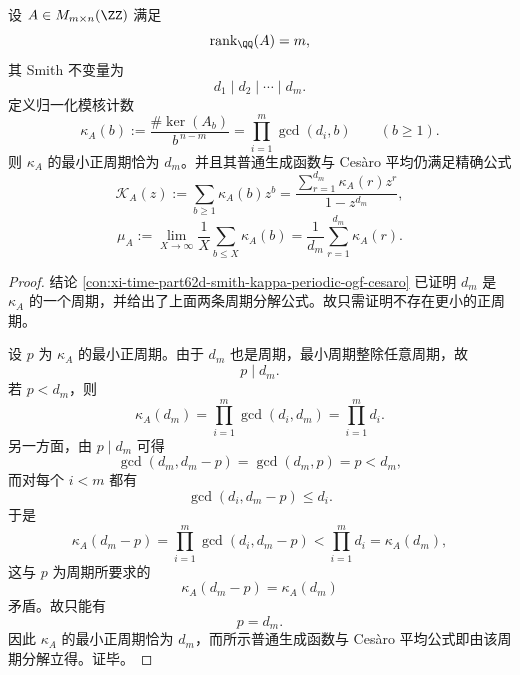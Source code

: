 \begin{conclusion}\label{con:xi-time-part62da-smith-kappa-minimal-period}
设 \(A\in M_{m\times n}(\ZZ)\) 满足
\[
\operatorname{rank}_{\QQ}(A)=m,
\]
其 Smith 不变量为
\[
d_1\mid d_2\mid\cdots\mid d_m.
\]
定义归一化模核计数
\[
\kappa_A(b):=
\frac{\#\ker(A_b)}{b^{\,n-m}}
=
\prod_{i=1}^{m}\gcd(d_i,b)
\qquad(b\ge 1).
\]
则 \(\kappa_A\) 的最小正周期恰为 \(d_m\)。并且其普通生成函数与 Ces\`aro 平均仍满足精确公式
\[
\mathscr K_A(z):=\sum_{b\ge 1}\kappa_A(b)z^b
=
\frac{\sum_{r=1}^{d_m}\kappa_A(r)z^r}{1-z^{d_m}},
\]
\[
\mu_A
:=
\lim_{X\to\infty}\frac{1}{X}\sum_{b\le X}\kappa_A(b)
=
\frac{1}{d_m}\sum_{r=1}^{d_m}\kappa_A(r).
\]
\end{conclusion}
\begin{proof}
结论 \ref{con:xi-time-part62d-smith-kappa-periodic-ogf-cesaro} 已证明 \(d_m\) 是 \(\kappa_A\) 的一个周期，并给出了上面两条周期分解公式。故只需证明不存在更小的正周期。

设 \(p\) 为 \(\kappa_A\) 的最小正周期。由于 \(d_m\) 也是周期，最小周期整除任意周期，故
\[
p\mid d_m.
\]
若 \(p<d_m\)，则
\[
\kappa_A(d_m)=\prod_{i=1}^{m}\gcd(d_i,d_m)=\prod_{i=1}^{m}d_i.
\]
另一方面，由 \(p\mid d_m\) 可得
\[
\gcd(d_m,d_m-p)=\gcd(d_m,p)=p<d_m,
\]
而对每个 \(i<m\) 都有
\[
\gcd(d_i,d_m-p)\le d_i.
\]
于是
\[
\kappa_A(d_m-p)
=
\prod_{i=1}^{m}\gcd(d_i,d_m-p)
<
\prod_{i=1}^{m}d_i
=
\kappa_A(d_m),
\]
这与 \(p\) 为周期所要求的
\[
\kappa_A(d_m-p)=\kappa_A(d_m)
\]
矛盾。故只能有
\[
p=d_m.
\]
因此 \(\kappa_A\) 的最小正周期恰为 \(d_m\)，而所示普通生成函数与 Ces\`aro 平均公式即由该周期分解立得。证毕。
\end{proof}

